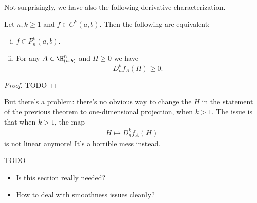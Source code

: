 Not surprisingly, we have also the following derivative characterization.

\begin{lause}
	Let $n, k \geq 1$ and $f \in C^{k}(a, b)$.
	Then the following are equivalent:
	\begin{enumerate}[(i)]
	\item $f \in P^{k}_{n}(a, b)$.
	\item For any $A \in \H^{n}_{(a, b)}$ and $H \geq 0$ we have
	\[
		D^{k}_{n}f_{A}(H) \geq 0.
	\]
	\end{enumerate}
\end{lause}
\begin{proof}
	TODO
\end{proof}

But there's a problem: there's no obvious way to change the $H$ in the statement of the previous theorem to one-dimensional projection, when $k > 1$. The issue is that when $k > 1$, the map
\begin{align*}
	H \mapsto D^{k}_{n}f_{A}(H)
\end{align*}
is not linear anymore! It's a horrible mess instead.

TODO

\begin{itemize}
	\item Is this section really needed?
	\item How to deal with smoothness issues cleanly?
\end{itemize}







